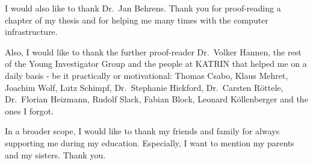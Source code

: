 I would also like to thank Dr.~Jan Behrens. Thank you for proof-reading  a chapter of my thesis and for helping me many times with the computer infrastructure.


Also, I would like to thank the further proof-reader Dr.~Volker Hannen, the rest of the Young Investigator Group and the people at KATRIN that helped me on a daily basis - be it practically or motivational: Thomas Csabo, Klaus Mehret, Joachim Wolf, Lutz Schimpf, Dr.~Stephanie Hickford, Dr.~Carsten Röttele, Dr.~Florian Heizmann, Rudolf Slack, Fabian Block, Leonard Köllenberger and the ones I forgot. 


In a broader scope, I would like to thank my friends and family for always supporting me during my education. Especially, I want to mention my parents and my sisters. Thank you.